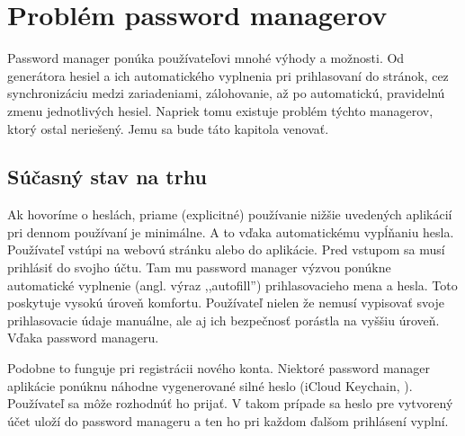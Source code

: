 \section{Problém password managerov}
Password manager ponúka používateľovi mnohé výhody a možnosti. Od generátora hesiel a ich automatického vyplnenia pri prihlasovaní do stránok, cez synchronizáciu medzi zariadeniami, zálohovanie, až po automatickú, pravidelnú zmenu jednotlivých hesiel. Napriek tomu existuje problém týchto managerov, ktorý ostal neriešený. Jemu sa bude táto kapitola venovať.

\subsection{Súčasný stav na trhu}
Ak hovoríme o heslách, priame (explicitné) používanie nižšie uvedených aplikácií pri dennom používaní je minimálne. A to vďaka automatickému vypĺňaniu hesla. Používateľ vstúpi na webovú stránku alebo do aplikácie. Pred vstupom sa musí prihlásiť do svojho účtu. Tam mu password manager výzvou ponúkne automatické vyplnenie (angl. výraz ,,autofill'') prihlasovacieho mena a hesla. Toto poskytuje vysokú úroveň komfortu. Používateľ nielen že nemusí vypisovať svoje prihlasovacie údaje manuálne, ale aj ich bezpečnosť porástla na vyššiu úroveň. Vďaka password manageru.
\par Podobne to funguje pri registrácii nového konta. Niektoré password manager aplikácie ponúknu náhodne vygenerované silné heslo (iCloud Keychain, \cite{10}). Používateľ sa môže rozhodnúť ho prijať. V takom prípade sa heslo pre vytvorený účet uloží do password manageru a ten ho pri každom ďalšom prihlásení vyplní. 
